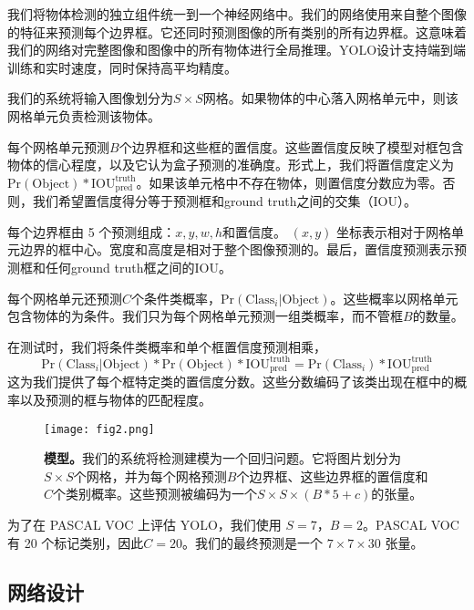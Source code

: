 \documentclass[../main.tex]{subfile}
\begin{document}
我们将物体检测的独立组件统一到一个神经网络中。我们的网络使用来自整个图像的特征来预测每个边界框。它还同时预测图像的所有类别的所有边界框。这意味着我们的网络对完整图像和图像中的所有物体进行全局推理。YOLO设计支持端到端训练和实时速度，同时保持高平均精度。

我们的系统将输入图像划分为$ S \times S $网格。如果物体的中心落入网格单元中，则该网格单元负责检测该物体。

每个网格单元预测$ B $个边界框和这些框的置信度。这些置信度反映了模型对框包含物体的信心程度，以及它认为盒子预测的准确度。形式上，我们将置信度定义为$\text{Pr}\left(\text{Object}\right) \ast \text{IOU}^\text{truth}_\text{pred}$。如果该单元格中不存在物体，则置信度分数应为零。否则，我们希望置信度得分等于预测框和ground truth之间的交集（IOU）。

每个边界框由 5 个预测组成：$x,y,w,h $和置信度。 $(x,y)$ 坐标表示相对于网格单元边界的框中心。宽度和高度是相对于整个图像预测的。最后，置信度预测表示预测框和任何ground truth框之间的IOU。

每个网格单元还预测$ C $个条件类概率，$\text{Pr}\left( \text{Class}_i \vert  \text{Object} \right)$。这些概率以网格单元包含物体的为条件。我们只为每个网格单元预测一组类概率，而不管框$ B $的数量。

在测试时，我们将条件类概率和单个框置信度预测相乘，
\begin{equation}
    \text{Pr}\left( \text{Class}_i \vert  \text{Object} \right) \ast \text{Pr}\left(\text{Object}\right) \ast \text{IOU}^\text{truth}_\text{pred} = \text{Pr}\left( \text{Class}_i \right) \ast \text{IOU}^\text{truth}_\text{pred}
\end{equation}
这为我们提供了每个框特定类的置信度分数。这些分数编码了该类出现在框中的概率以及预测的框与物体的匹配程度。

\begin{figure}[htb]
    \centering
    \texttt{[image: fig2.png]}
    \caption{\textbf{模型。}我们的系统将检测建模为一个回归问题。它将图片划分为$S\times S$个网格，并为每个网格预测$B$个边界框、这些边界框的置信度和$C$个类别概率。这些预测被编码为一个$S\times S \times \left( B \ast 5 + c \right)$的张量。}
    \label{fig:fig2}
\end{figure}

为了在 PASCAL VOC 上评估 YOLO，我们使用 $S = 7$，$B = 2$。PASCAL VOC 有 20 个标记类别，因此$ C = 20$。我们的最终预测是一个 $7 \times 7 \times 30$ 张量。

\subsection{网络设计}
\end{document}
